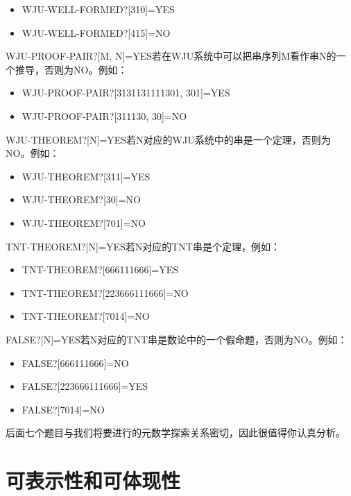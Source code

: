 \documentclass[
  12pt,
  twoside,
  openright,
  oldfontcommands,
]{memoir}
\providecommand{\tightlist}{%
  \setlength{\itemsep}{0pt}\setlength{\parskip}{0pt}}
\begin{document}
\begin{itemize}
\tightlist
\item
  WJU-WELL-FORMED?{[}310{]}=YES
\item
  WJU-WELL-FORMED?{[}415{]}=NO
\end{itemize}

WJU-PROOF-PAIR?{[}M,
N{]}=YES若在WJU系统中可以把串序列M看作串N的一个推导，否则为NO。例如：

\begin{itemize}
\tightlist
\item
  WJU-PROOF-PAIR?{[}3131131111301, 301{]}=YES
\item
  WJU-PROOF-PAIR?{[}311130, 30{]}=NO
\end{itemize}

WJU-THEOREM?{[}N{]}=YES若N对应的WJU系统中的串是一个定理，否则为NO。例如：

\begin{itemize}
\tightlist
\item
  WJU-THEOREM?{[}311{]}=YES
\item
  WJU-THEOREM?{[}30{]}=NO
\item
  WJU-THEOREM?{[}701{]}=NO
\end{itemize}

TNT-THEOREM?{[}N{]}=YES若N对应的TNT串是个定理，例如：

\begin{itemize}
\tightlist
\item
  TNT-THEOREM?{[}666111666{]}=YES
\item
  TNT-THEOREM?{[}223666111666{]}=NO
\item
  TNT-THEOREM?{[}7014{]}=NO
\end{itemize}

FALSE?{[}N{]}=YES若N对应的TNT串是数论中的一个假命题，否则为NO。例如：

\begin{itemize}
\tightlist
\item
  FALSE?{[}666111666{]}=NO
\item
  FALSE?{[}223666111666{]}=YES
\item
  FALSE?{[}7014{]}=NO
\end{itemize}

后面七个题目与我们将要进行的元数学探索关系密切，因此很值得你认真分析。

\section{可表示性和可体现性}
\end{document}
